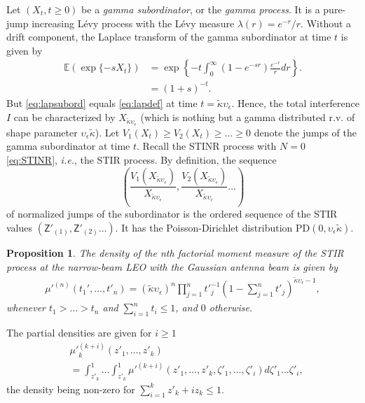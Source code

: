 \documentclass[lettersize,journal]{IEEEtran}
\newtheorem{prop}[theorem]{Proposition}
\begin{document}
Let $(X_{t}, t \geq 0)$ be a \textit{gamma subordinator}, or the \textit{gamma process}. It is a pure-jump increasing Lévy process with the Lévy measure $\lambda(r) = e^{- r}/r$. Without a drift component, the Laplace transform of the gamma subordinator at time $t$ is given by
\begin{align}
  \label{eq:lapsubord}
  \mathbb{E}(\exp\{-s X_{t}\}) &= \exp\left\{-{t} \int_0^{\infty}(1-e^{-s r})\frac{e^{-r}}{r} dr \right\}. \nonumber \\
  &=(1+s)^{-t}.
\end{align}
But \eqref{eq:lapsubord} equals \eqref{eq:lapdef} at time $t=\tilde{\kappa}\upsilon_{\epsilon} $. Hence, the total interference $I$ can be characterized by $X_{\tilde{\kappa} \upsilon_{\epsilon}}$ (which is nothing but a gamma distributed r.v. of shape parameter $\upsilon_{\epsilon}\tilde{\kappa}$). Let $V_1(X_{t}) \geq V_2(X_{t})\geq \dots \geq 0 $ denote the jumps of the gamma subordinator at time $t$. Recall the STINR process with $N=0$ \eqref{eq:STINR}, \textit{i.e.}, the STIR process. By definition, the sequence
\begin{equation}
  \label{eq:relativesequence}
  \left(\frac{V_1(X_{\tilde{\kappa}\upsilon_{\epsilon}})}{X_{\tilde{\kappa}\upsilon_{\epsilon}}},\frac{V_2(X_{\tilde{\kappa}\upsilon_{\epsilon}})}{X_{\tilde{\kappa}\upsilon_{\epsilon}}} \dots \right)
\end{equation}
of normalized jumps of the subordinator is the ordered sequence of the STIR values $(\mathsf{Z}'_{(1)},\mathsf{Z}'_{(2)} \dots)$. It has the Poisson-Dirichlet distribution PD$(0, \upsilon_{\epsilon} \tilde{\kappa})$. 




\begin{prop}
  The density of the n\textit{th} factorial moment measure of the STIR process at the narrow-beam LEO with the Gaussian antenna beam is given by
  \begin{align}
    \label{eq:factorialmoment}
    \mu'^{(n)}(t_1',\dots,t'_n) = (\tilde{\kappa}\upsilon_{\epsilon})^n\prod_{j=1}^n{t'}_{j}^{-1}\left(1- \sum_{j=1}^nt'_j \right)^{\tilde{\kappa}\upsilon_{\epsilon}-1},       
  \end{align}
  whenever $t_1>\dots >t_n$ and $\sum_{i=1}^n t_i \leq 1$, and $0$ otherwise.
\end{prop}
The partial densities are given for $i\geq 1$
\begin{align}
  \label{eq:auxillary}
  &{\mu'}_k^{(k+i)}(z'_1,\dots,z'_k) \nonumber \\
  &= \int_{z'_k}^1 \dots \int_{z'_k}^1 {\mu'}^{(k+i)}(z'_1,\dots,z'_k,\zeta'_1,\dots,\zeta'_i) d\zeta'_1 \dots \zeta'_i,
\end{align}
the density being non-zero for $\sum_{i=1}^kz'_k+iz_k \leq 1 $. 
\end{document}
